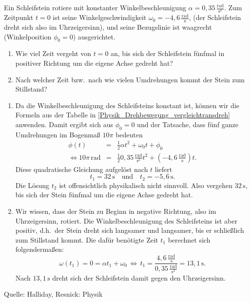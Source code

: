     \begin{MExercises}
    
    \begin{MExercise}
    Ein Schleifstein rotiere mit konstanter Winkelbeschleunigung $\alpha=0{,}35\,\frac{\text{rad}}{\text{s}^2}$. Zum Zeitpunkt $t=0$ ist seine Winkelgeschwindigkeit $\omega_0=-4{,}6\,\frac{\text{rad}}{\text{s}}$, (der Schleifstein dreht sich also im Uhrzeigersinn), und seine Bezugslinie ist waagrecht (Winkelposition $\phi_0=0$) ausgerichtet. 
    \begin{enumerate}
    \item Wie viel Zeit vergeht von $t=0$ an, bis sich der Schleifstein f\"unfmal in positiver Richtung um die eigene Achse gedreht hat?
    \item Nach welcher Zeit bzw.~nach wie vielen Umdrehungen kommt der Stein zum Stillstand?
    \end{enumerate}
    \begin{MSolution}
    \begin{enumerate}
    \item Da die Winkelbeschleunigung des Schleifsteins konstant ist, k\"onnen wir die Formeln aus der Tabelle in \ref{Physik_Drehbewegung_vergleichtransdreh} anwenden. Damit ergibt sich aus $\phi_0=0$ und der Tatsache, dass f\"unf ganze Umdrehungen im Bogenma{\ss} $10\pi$ bedeuten
    \begin{eqnarray}
    \phi(t)&=&\frac{1}{2}\alpha t^2+\omega_0t+\phi_0\\
    \Leftrightarrow 10\pi\,\text{rad}&=&\frac{1}{2}0{,}35\,\frac{\text{rad}}{\text{s}^2}t^2+(-4{,}6\,\frac{\text{rad}}{\text{s}})t.
    \end{eqnarray} Diese quadratische Gleichung aufgel\"ost nach $t$ liefert
    \begin{equation*}
    t_1=32\,\text{s}\quad\text{und}\quad t_2=-5{,}6\,\text{s.}
    \end{equation*} Die L\"osung $t_2$ ist offensichtlich physikalisch nicht sinnvoll. Also vergehen $32\,\text{s}$, bis sich der Stein f\"unfmal um die eigene Achse gedreht hat.
    \item Wir wissen, dass der Stein zu Beginn in negative Richtung, also im Uhrzeigersinn, rotiert. Die Winkelbeschleunigung des Schleifsteins ist aber positiv, d.h.~der Stein dreht sich langsamer und langsamer, bis er schlie{\ss}lich zum Stillstand kommt. Die daf\"ur ben\"otigte Zeit $t_1$ berechnet sich folgenderma{\ss}en:
    \begin{equation*}
    \omega(t_1)=0=\alpha t_1+\omega_0\,\Leftrightarrow\, t_1=\frac{4{,}6\,\frac{\text{rad}}{\text{s}}}{0{,}35\,\frac{\text{rad}}{\text{s}^2}}=13{,}1\,\text{s}.
    \end{equation*}Nach $13{,}1\,\text{s}$ dreht sich der Schleifstein damit gegen den Uhrzeigersinn. 
    \end{enumerate}
    Quelle: Halliday, Resnick: Physik
    \end{MSolution}
    \end{MExercise}
    
    \end{MExercises}
    
